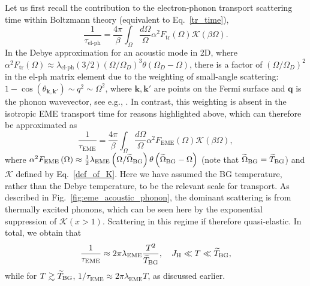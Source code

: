 \documentclass[aps,prl,twocolumn,superscriptaddress,amsmath,nofootinbib,10pt,floatfix]{revtex4-2}
\begin{document}
\begin{widetext}
 
Let us first recall the contribution to the electron-phonon transport scattering time \cite{Allen1993,sadovskii_diagrammatics_2019} within Boltzmann theory (equivalent to Eq.~\eqref{tr_time}), 
\begin{equation}
    \frac{1}{\tau_{\text{el-ph}}}=\frac{4\pi}{\beta}\int_{\Omega}\frac{d\Omega}{\Omega}\alpha^{2}F_{\text{tr}}\left(\Omega\right)\mathcal{K}\left(\beta\Omega\right).
\end{equation}
In the Debye approximation for an acoustic mode in 2D, where $\alpha^{2}F_{\text{tr}}\left(\Omega\right)\approx \lambda_{\text{el-ph}} (3/2)\left(\Omega/\Omega_{D}\right)^{3}\theta\left(\Omega_{D}-\Omega\right)$, there is a factor of $\left(\Omega/\Omega_{D}\right)^{2}$ in the el-ph matrix element due to the weighting of small-angle scattering: $1-\cos\left( \theta_{\boldsymbol{k},\boldsymbol{k'}}\right) \sim q^2 \sim \Omega^2$, where $\boldsymbol{k},\boldsymbol{k'}$ are points on the Fermi surface and $\boldsymbol{q}$ is the phonon wavevector, see e.g., \cite{Ziman_2001}. In contrast, this weighting is absent in the isotropic EME transport time for reasons highlighted above, which can therefore be approximated as 
\begin{equation}
    \frac{1}{\tau_{\text{EME}}}=\frac{4\pi}{\beta}\int_{\Omega}\frac{d\Omega}{\Omega}\alpha^{2}F_{\text{EME}}\left(\Omega\right)\mathcal{K}\left(\beta\Omega\right),
\end{equation}
where $\alpha^{2}F_{\text{\text{EME}}}\left(\Omega\right)\approx\frac{1}{2}\lambda_{\text{EME}}\left(\Omega/\widetilde{\Omega}_{\text{BG}}\right)\theta\left(\widetilde{\Omega}_{\text{BG}}-\Omega\right)$ (note that $\widetilde{\Omega}_{\rm BG} = \widetilde{T}_{\rm BG}$) and $\mathcal{K}$ defined by Eq.~\eqref{def_of_K}. Here we have assumed the BG temperature, rather than the Debye temperature, to be the relevant scale for transport. As described in Fig.~\ref{fig:eme_acoustic_phonon}, the dominant scattering is from thermally excited phonons, which can be seen here by the exponential suppression of $\mathcal{K}(x>1)$. Scattering in this regime if therefore quasi-elastic. In total, we obtain that
\begin{equation}
    \frac{1}{\tau_{\text{EME}}}\approx2\pi\lambda_{\text{EME}}\frac{T^{2}}{\widetilde{T}_{\text{BG}}}, \quad J_{\rm H} \ll T \ll \widetilde{T}_{\rm BG},
\end{equation}
while for $T\gtrsim \widetilde{T}_{\rm BG}$, $1/\tau_{\text{EME}}\approx2\pi\lambda_{\text{EME}}T$, as discussed earlier.


\end{widetext}


\end{document}

